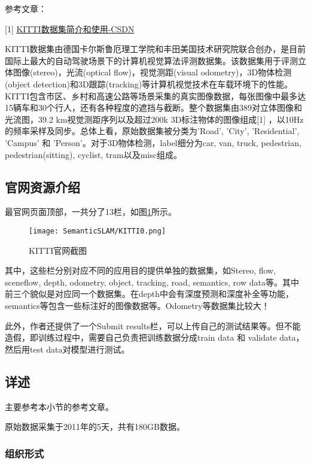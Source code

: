 参考文章：

[1] \href{https://blog.csdn.net/Solomon1558/article/details/70173223}{KITTI数据集简介和使用-CSDN}

KITTI数据集由德国卡尔斯鲁厄理工学院和丰田美国技术研究院联合创办，是目前国际上最大的自动驾驶场景下的计算机视觉算法评测数据集。该数据集用于评测立体图像(stereo)，光流(optical flow)，视觉测距(visual odometry)，3D物体检测(object detection)和3D跟踪(tracking)等计算机视觉技术在车载环境下的性能。KITTI包含市区、乡村和高速公路等场景采集的真实图像数据，每张图像中最多达15辆车和30个行人，还有各种程度的遮挡与截断。整个数据集由389对立体图像和光流图，39.2 km视觉测距序列以及超过200k 3D标注物体的图像组成[1] ，以10Hz的频率采样及同步。总体上看，原始数据集被分类为’Road’, ’City’, ’Residential’, ’Campus’ 和 ’Person’。对于3D物体检测，label细分为car, van, truck, pedestrian, pedestrian(sitting), cyclist, tram以及misc组成。

\subsection{官网资源介绍}

最官网页面顶部，一共分了13栏，如图\ref{KITTI0}所示。

\begin{figure}[!hbtp]
\centering
\texttt{[image: SemanticSLAM/KITTI0.png]}
\caption{KITTI官网截图}
\label{KITTI0}
\end{figure}

其中，这些栏分别对应不同的应用目的提供单独的数据集，如Stereo, flow, sceneflow, depth, odometry, object, tracking, road, semantics, row data等。其中前三个貌似是对应同一个数据集。在depth中会有深度预测和深度补全等功能，semantics等包含一些标注好的图像数据等。Odometry等数据集比较大！

此外，作者还提供了一个Submit results栏，可以上传自己的测试结果等。但不能造假，即训练过程中，需要自己负责把训练数据分成train data 和 validate data， 然后用test data对模型进行测试。

\subsection{详述}

主要参考本小节的参考文章。

原始数据采集于2011年的5天，共有180GB数据。 

\subsubsection{组织形式}


